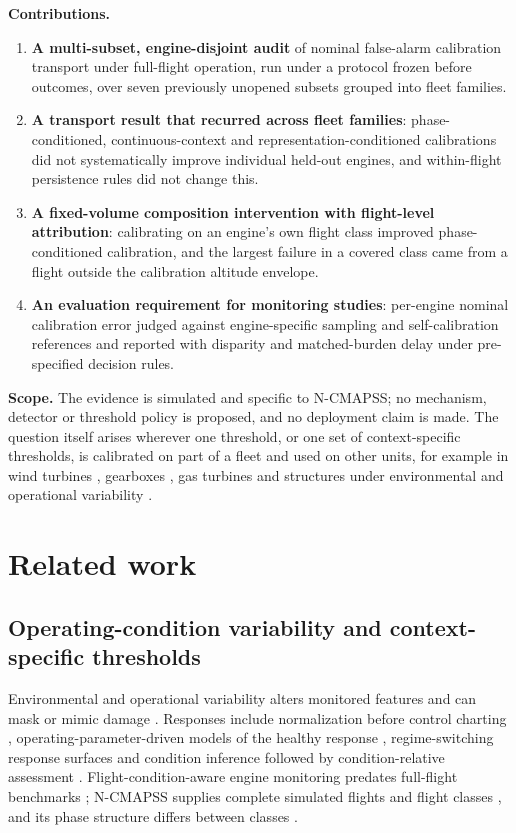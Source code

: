 \documentclass[preprint,11pt,a4paper]{elsarticle}
\begin{document}
\textbf{Contributions.}
\begin{enumerate}
\item \textbf{A multi-subset, engine-disjoint audit} of nominal false-alarm calibration transport under full-flight operation, run under a protocol frozen before outcomes, over seven previously unopened subsets grouped into fleet families.
\item \textbf{A transport result that recurred across fleet families}: phase-conditioned, continuous-context and representation-conditioned calibrations did not systematically improve individual held-out engines, and within-flight persistence rules did not change this.
\item \textbf{A fixed-volume composition intervention with flight-level attribution}: calibrating on an engine's own flight class improved phase-conditioned calibration, and the largest failure in a covered class came from a flight outside the calibration altitude envelope.
\item \textbf{An evaluation requirement for monitoring studies}: per-engine nominal calibration error judged against engine-specific sampling and self-calibration references and reported with disparity and matched-burden delay under pre-specified decision rules.
\end{enumerate}

\textbf{Scope.} The evidence is simulated and specific to N-CMAPSS; no mechanism, detector or threshold policy is proposed, and no deployment claim is made. The question itself arises wherever one threshold, or one set of context-specific thresholds, is calibrated on part of a fleet and used on other units, for example in wind turbines \cite{N1,N4}, gearboxes \cite{N3}, gas turbines \cite{N13,N38} and structures under environmental and operational variability \cite{N2,N5,N6}.

\section{Related work}

\subsection{Operating-condition variability and context-specific thresholds}

Environmental and operational variability alters monitored features and can mask or mimic damage \cite{N2}. Responses include normalization before control charting \cite{N2,N5}, operating-parameter-driven models of the healthy response \cite{N4}, regime-switching response surfaces \cite{N6} and condition inference followed by condition-relative assessment \cite{N3}. Flight-condition-aware engine monitoring predates full-flight benchmarks \cite{ref3,ref4,ref5,N35}; N-CMAPSS supplies complete simulated flights and flight classes \cite{ref1}, and its phase structure differs between classes \cite{N28}.
\end{document}
